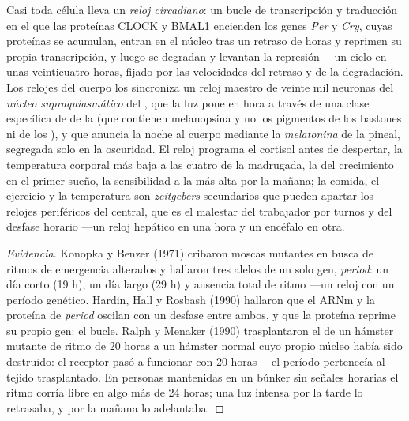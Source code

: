 \begin{definition}\label{def:b3:endocrinology:clock}
Casi toda célula lleva un \emph{reloj circadiano}: un bucle de
transcripción y traducción en el que las proteínas CLOCK y BMAL1
encienden los genes \emph{Per} y \emph{Cry}, cuyas proteínas se
acumulan, entran en el núcleo tras un retraso de horas y reprimen su
propia transcripción, y luego se degradan y levantan la represión ---un
ciclo en unas veinticuatro horas, fijado por las velocidades del
retraso y de la degradación. Los relojes del cuerpo los sincroniza un
reloj maestro de veinte mil neuronas del \emph{núcleo supraquiasmático}
del , que la luz pone en hora a través de una clase
específica de  de la  (que contienen
melanopsina y no los pigmentos de los bastones ni de los ), y que
anuncia la noche al cuerpo mediante la \emph{melatonina} de la pineal,
segregada solo en la oscuridad. El reloj programa el cortisol antes de
despertar, la temperatura corporal más baja a las cuatro de la
madrugada, la  del crecimiento en el primer sueño, la
sensibilidad a la  más alta por la mañana; la comida, el
ejercicio y la temperatura son \emph{zeitgebers} secundarios que pueden
apartar los relojes periféricos del central, que es el malestar del
trabajador por turnos y del desfase horario ---un reloj hepático en una
hora y un encéfalo en otra.
\end{definition}

\begin{proof}[Evidencia]
Konopka y Benzer (1971) cribaron moscas mutantes en busca de ritmos de
emergencia alterados y hallaron tres alelos de un solo gen,
\emph{period}: un día corto (19 h), un día largo (29 h) y ausencia
total de ritmo ---un reloj con un período genético. Hardin, Hall y
Rosbash (1990) hallaron que el ARNm y la proteína de \emph{period}
oscilan con un desfase entre ambos, y que la proteína reprime su propio
gen: el bucle. Ralph y Menaker (1990) trasplantaron el  de un hámster mutante de ritmo de 20 horas a un
hámster normal cuyo propio núcleo había sido destruido: el receptor
pasó a funcionar con 20 horas ---el período pertenecía al tejido
trasplantado. En personas mantenidas en un búnker sin señales horarias
el ritmo corría libre en algo más de 24 horas; una luz intensa por la
tarde lo retrasaba, y por la mañana lo adelantaba.
\end{proof}

